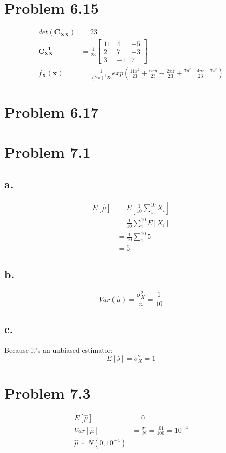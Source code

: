 \documentclass[12pt]{article}
\begin{document}
\section{Problem 6.15}
\begin{align*}
  det(\bm{C_{XX}}) &= 23 \\
  \bm{C_{XX}^{-1}} &= \frac{1}{23} 
  \begin{bmatrix}
    11 & 4 & -5 \\
    2 & 7 & -3 \\
    3 & -1 & 7
  \end{bmatrix} \\
  f_{\bm{X}}(\bm{x}) &= \frac{1}{(2\pi)^3 23} exp\left( \frac{11x^2}{23} + \frac{6xy}{23}-\frac{2xz}{23} +
  \frac{7y^2 - 4yz + 7z^2}{23}\right)
\end{align*}

\section{Problem 6.17}

\section{Problem 7.1}
\subsection{a.}
\begin{align*}
  E[\hat\mu] &= E\left[ \frac{1}{10}\sum_1^{10} X_i \right] \\
  &= \frac{1}{10}\sum_1^{10}E[X_i] \\
  &= \frac{1}{10}\sum_1^{10}5 \\
  &= 5
\end{align*}
\subsection{b.}
\[Var(\hat\mu) = \frac{\sigma_X^2}{n} = \frac{1}{10} \]
\subsection{c.}
Because it's an unbiased estimator:
\[E[\hat s] = \sigma_X^2 = 1\]

\section{Problem 7.3}
\begin{align*}
  E[\hat\mu] &= 0 \\
  Var[\hat\mu] &= \frac{\sigma^2}{N} = \frac{.01}{100} = 10^{-4} \\
  \hat\mu \sim N(0,10^{-4})
\end{align*}
\end{document}
